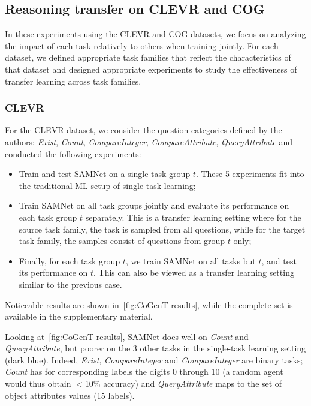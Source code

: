 \subsection{Reasoning transfer on CLEVR and COG}
\label{sec:reasoning}
In these experiments using the CLEVR and COG datasets, we focus on analyzing the impact 
of each task relatively to others when training jointly.
For each dataset, we defined appropriate task families that reflect the characteristics of that dataset and designed
appropriate experiments to study the effectiveness of transfer learning across task families.

\subsubsection{CLEVR}
\label{sec:reasoning-clevr}
For the CLEVR dataset, we consider the question categories defined by the authors: \textit{Exist}, \textit{Count}, \textit{CompareInteger}, \textit{CompareAttribute}, \textit{QueryAttribute} and conducted the following experiments:
\begin{itemize}
	\item Train and test SAMNet on a single task group $t$. These 5 experiments fit into the traditional ML setup of single-task learning;
	\item Train SAMNet on all task groups jointly and evaluate its performance on each task group $t$ separately.
	This is a transfer learning setting where for the source task family, the task is sampled from all questions,
	while for the target task family, the samples consist of questions from group $t$ only;
	\item Finally, for each task group $t$, we train SAMNet on all tasks but $t$, and test its performance on $t$.
	This can also be viewed as a transfer learning setting similar to the previous case.
\end{itemize}

Noticeable results are shown in~\cref{fig:CoGenT-results}, while the complete set is available in the supplementary material.%


Looking at~\cref{fig:CoGenT-results}, SAMNet does well on \textit{Count} and \textit{QueryAttribute}, but poorer on the 3 other tasks in the single-task learning setting (dark blue). Indeed, \textit{Exist}, \textit{CompareInteger} and \textit{CompareInteger} are binary tasks; \textit{Count} has for corresponding labels the digits 0 through 10 (a random agent would thus obtain $<$10\% accuracy) and \textit{QueryAttribute} maps to the set of object attributes values (15 labels).

